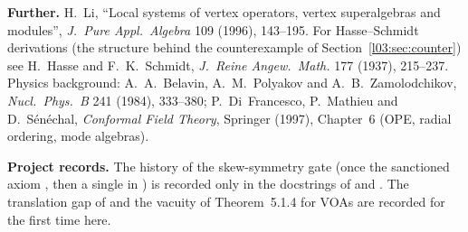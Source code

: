 \textbf{Further.} H.~Li, ``Local systems of vertex operators, vertex superalgebras and modules'',
\emph{J.\ Pure Appl.\ Algebra} 109 (1996), 143--195.
For
Hasse--Schmidt derivations (the structure behind the counterexample of Section~\ref{l03:sec:counter})
see H.~Hasse and F.~K.~Schmidt, \emph{J.\ Reine Angew.\ Math.} 177 (1937), 215--237.
Physics background: A.~A.~Belavin, A.~M.~Polyakov and A.~B.~Zamolodchikov, \emph{Nucl.\ Phys.\ B} 241
(1984), 333--380; P.~Di~Francesco, P.~Mathieu and D.~S\'en\'echal, \emph{Conformal Field Theory},
Springer (1997), Chapter~6 (OPE, radial ordering, mode algebras).

\textbf{Project records.} The history of the skew-symmetry gate (once the sanctioned axiom
, then a single  in ) is recorded only in
the docstrings of  and . The translation gap of
 and the vacuity of Theorem~5.1.4 for VOAs are recorded for the first time here.

\endgroup
